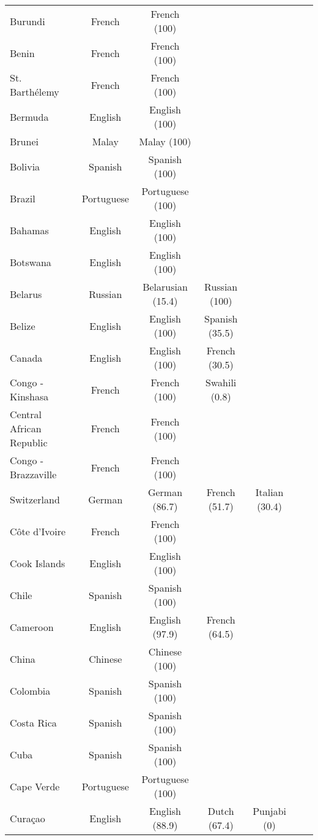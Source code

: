 \begin{longtable}{lc | c | c | c | c | c}
 Burundi & French & French (100) &   &   &   &   \\ 
 Benin & French & French (100) &   &   &   &   \\ 
 St. Barthélemy & French & French (100) &   &   &   &   \\ 
 Bermuda & English & English (100) &   &   &   &   \\ 
 Brunei & Malay & Malay (100) &   &   &   &   \\ 
 Bolivia & Spanish & Spanish (100) &   &   &   &   \\ 
 Brazil & Portuguese & Portuguese (100) &   &   &   &   \\ 
 Bahamas & English & English (100) &   &   &   &   \\ 
 Botswana & English & English (100) &   &   &   &   \\ 
 Belarus & Russian & Belarusian (15.4) & Russian (100) &   &   &   \\ 
 Belize & English & English (100) & Spanish (35.5) &   &   &   \\ 
 Canada & English & English (100) & French (30.5) &   &   &   \\ 
 Congo - Kinshasa & French & French (100) & Swahili (0.8) &   &   &   \\ 
 Central African Republic & French & French (100) &   &   &   &   \\ 
 Congo - Brazzaville & French & French (100) &   &   &   &   \\ 
 Switzerland & German & German (86.7) & French (51.7) & Italian (30.4) &   &   \\ 
 Côte d’Ivoire & French & French (100) &   &   &   &   \\ 
 Cook Islands & English & English (100) &   &   &   &   \\ 
 Chile & Spanish & Spanish (100) &   &   &   &   \\ 
 Cameroon & English & English (97.9) & French (64.5) &   &   &   \\ 
 China & Chinese & Chinese (100) &   &   &   &   \\ 
 Colombia & Spanish & Spanish (100) &   &   &   &   \\ 
 Costa Rica & Spanish & Spanish (100) &   &   &   &   \\ 
 Cuba & Spanish & Spanish (100) &   &   &   &   \\ 
 Cape Verde & Portuguese & Portuguese (100) &   &   &   &   \\ 
 Curaçao & English & English (88.9) & Dutch (67.4) & Punjabi (0) &   &   \\ 

\end{longtable}
